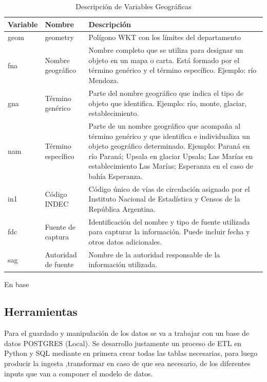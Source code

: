 \documentclass{article}
\theoremstyle{mytheoremstyle}
\theoremstyle{mytheoremstyle}
\theoremstyle{myproblemstyle}
\begin{document}
\begin{table}[htbp]
    \centering
    \caption{Descripción de Variables Geográficas}
    \begin{tabular}{|l|l|p{8cm}|}
        \hline
        \textbf{Variable} & \textbf{Nombre} & \textbf{Descripción} \\
        \hline
        geom & geometry & Polígono WKT con los límites del departamento \\
        fna & Nombre geográfico & Nombre completo que se utiliza para designar un objeto en un mapa o carta. Está formado por el término genérico y el término específico. Ejemplo: río Mendoza. \\
        gna & Término genérico & Parte del nombre geográfico que indica el tipo de objeto que identifica. Ejemplo: río, monte, glaciar, establecimiento. \\
        nam & Término específico & Parte de un nombre geográfico que acompaña al término genérico y que identifica e individualiza un objeto geográfico determinado. Ejemplo: Paraná en río Paraná; Upsala en glaciar Upsala; Las Marías en establecimiento Las Marías; Esperanza en el caso de bahía Esperanza. \\
        in1 & Código INDEC & Código único de vías de circulación asignado por el Instituto Nacional de Estadística y Censos de la República Argentina. \\
        fdc & Fuente de captura & Identificación del nombre y tipo de fuente utilizada para capturar la información. Puede incluir fecha y otros datos adicionales. \\
        sag & Autoridad de fuente & Nombre de la autoridad responsable de la información utilizada. \\
        \hline
    \end{tabular}
    \label{tab:geo.depto}
\end{table}

En base

\subsection{Herramientas }
Para el guardado y manipulación de los datos se va a trabajar con un base de datos POSTGRES (Local). 
Se desarrollo justamente un proceso de ETL en Python y SQL mediante en primera crear todas las tablas necesarias, 
para luego producir la ingesta ,transformar en caso de que sea necesario, de los diferentes inputs que van a componer el modelo de datos.	
\end{document}
